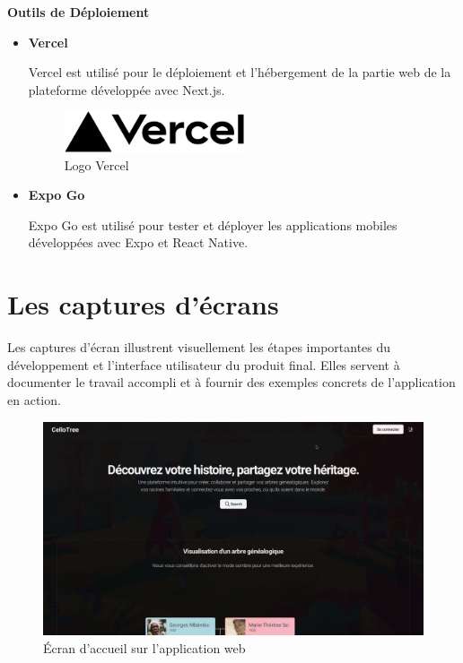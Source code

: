 \textbf{Outils de Déploiement}
\begin{itemize}
  \item \textbf{Vercel}

    Vercel est utilisé pour le déploiement et l'hébergement de la partie web
    de la plateforme développée avec Next.js.

    \begin{figure}[H]
      \centering
      \includegraphics[width=0.5\textwidth]{images/Vercel_logo_black.svg.png}
      \caption{Logo Vercel}
    \end{figure}

  \item \textbf{Expo Go}

    Expo Go est utilisé pour tester et déployer les applications mobiles
    développées avec Expo et React Native.
\end{itemize}


\section{Les captures d'écrans}
Les captures d’écran illustrent visuellement les étapes importantes du
développement et l’interface utilisateur du produit final. Elles servent à
documenter le travail accompli et à fournir des exemples concrets de
l’application en action.

\begin{figure}[H]
  \centering
  \includegraphics[width=1\textwidth]{./capture/home.png}
  \caption{Écran d'accueil sur l'application web}
\end{figure}

